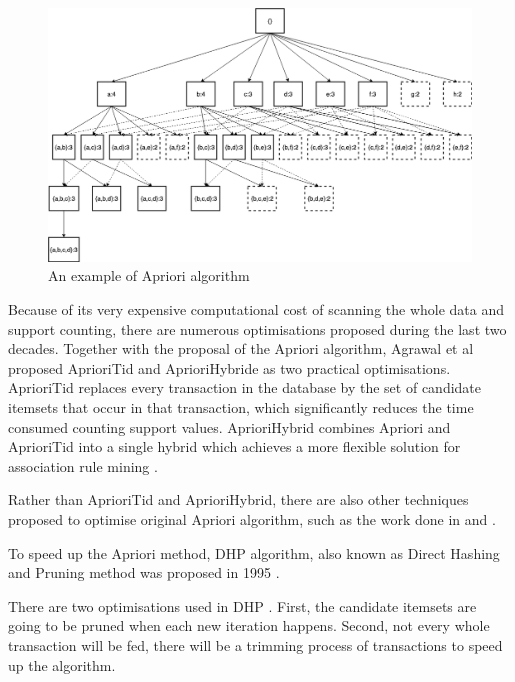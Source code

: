 \begin{figure}[H]
    \centering
    \includegraphics[width=1.0\textwidth]{RelatedWorks/apriori.png}
    \caption{An example of Apriori algorithm \cite{apriorifig}}
    \label{fig:apriori}
\end{figure}

Because of its very expensive computational cost of scanning the whole data and support counting, there are numerous optimisations proposed during the last two decades. Together with the proposal of the Apriori algorithm, Agrawal et al \cite{apriori} proposed AprioriTid and AprioriHybride as two practical optimisations. AprioriTid \cite{apriori} replaces every transaction in the database by the set of candidate itemsets that occur in that transaction, which significantly reduces the time consumed counting support values. AprioriHybrid combines Apriori and AprioriTid into a single hybrid which achieves a more flexible solution for association rule mining \cite{apriori}.

Rather than AprioriTid and AprioriHybrid, there are also other techniques proposed to optimise original Apriori algorithm, such as the work done in \cite{apriori2} and \cite{apriori3}.

To speed up the Apriori method, DHP algorithm, also known as Direct Hashing and Pruning method was proposed in 1995 \cite{DHP}.

\begin{definition}
\label{DHP}
 There are two optimisations used in DHP \cite{DHP}. First, the candidate itemsets are going to be pruned when each new iteration happens. Second, not every whole transaction will be fed, there will be a trimming process of transactions to speed up the algorithm.
\end{definition}

